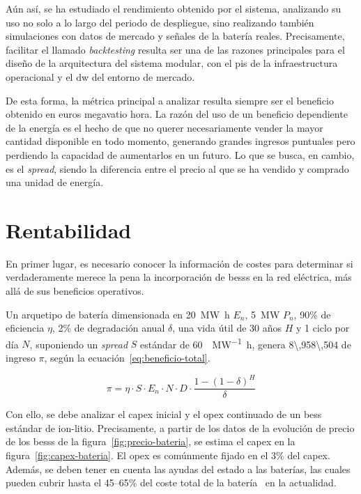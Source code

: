 Aún así, se ha estudiado el rendimiento obtenido por el sistema, analizando su uso no solo a lo largo del periodo de despliegue, sino realizando también simulaciones con datos de mercado y señales de la batería reales. Precisamente, facilitar el llamado \textit{backtesting} resulta ser una de las razones principales para el diseño de la arquitectura del sistema modular, con el \gls{pis} de la infraestructura operacional y el \gls{dw} del entorno de mercado.

De esta forma, la métrica principal a analizar resulta siempre ser el beneficio obtenido en euros megavatio hora. La razón del uso de un beneficio dependiente de la energía es el hecho de que no querer necesariamente vender la mayor cantidad disponible en todo momento, generando grandes ingresos puntuales pero perdiendo la capacidad de aumentarlos en un futuro. Lo que se busca, en cambio, es el \textit{spread}, siendo la diferencia entre el precio al que se ha vendido y comprado una unidad de energía.

\section{Rentabilidad}
\label{makereference7.1}

En primer lugar, es necesario conocer la información de costes para determinar si verdaderamente merece la pena la incorporación de \glspl{bess} en la red eléctrica, más allá de sus beneficios operativos.

Un arquetipo de batería dimensionada en \SI{20}{\mega\watt\hour} \( E_{n} \), \SI{5}{\mega\watt} \( P_{n} \), 90\% de eficiencia \( \eta \), 2\% de degradación anual \( \delta \), una vida útil de 30 años \( H \) y 1 ciclo por día \( N \), suponiendo un \textit{spread} \( S \) estándar de \SI{60}{\text{\euro}\per\mega\watt\hour}, genera \SI{8\,958\,504}{\text{\euro}} de ingreso \( \pi \), según la ecuación~\ref{eq:beneficio-total}.

\begin{equation}
  \label{eq:beneficio-total}
  \pi = \eta \cdot S \cdot E_{n} \cdot N \cdot D \cdot \frac{1 - (1 - \delta)^{H}}{\delta}
\end{equation}

Con ello, se debe analizar el \gls{capex} inicial y el \gls{opex} continuado de un \gls{bess} estándar de ion-litio. Precisamente, a partir de los datos de la evolución de precio de los \glspl{bess} de la figura~\ref{fig:precio-bateria}, se estima el \gls{capex} en la figura~\ref{fig:capex-bateria}. El \gls{opex} es comúnmente fijado en el 3\% del \gls{capex}. Además, se deben tener en cuenta las ayudas del estado a las baterías, las cuales pueden cubrir hasta el 45--65\% del coste total de la batería~\cite{solfy2025subvenciones} en la actualidad.


